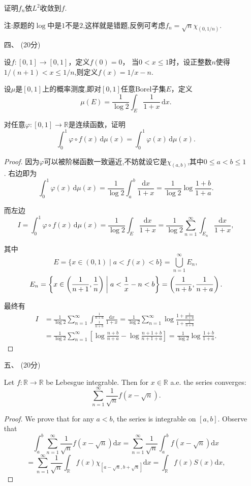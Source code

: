 \begin{itemize}
证明$ f_{n} $依$ L^{2} $收敛到$ f $.

注:原题的$ \log $中是$ 1 $不是$ 2 $,这样就是错题,反例可考虑$ f_{n}=\sqrt{n}\chi_{(0,1/n)} $.


\item[四、](20分)

设$ f\colon[0,1]\to [0,1] $，定义$ f(0)=0 $，
当$ 0<x\le 1 $时，设正整数$ n $使得$ 1/(n+1)<x\le 1/n $,则定义$ f(x)=1/x-n $.

设$ \mu $是$ [0,1] $上的概率测度,即对$ [0,1] $任意Borel子集$ E $，定义
$$\mu(E) =\frac{1}{\log 2}\int_E\frac{1}{1+x}\,\text{d}x.$$

对任意$ \varphi\colon[0,1]\to \mathbb{R}  $是连续函数，证明
$$\int_0^1{\varphi \circ f(x) \,\text{d}\mu(x)}
=\int_0^1{\varphi (x) \,\text{d}\mu(x)}.$$

\begin{proof}
因为$ \varphi $可以被阶梯函数一致逼近,不妨就设它是$ \chi_{(a,b)} $,其中$ 0\le a<b\le 1 $.
右边即为
$$\int_0^1{\varphi (x) \,\text{d}\mu(x)}
=\frac{1}{\log 2}\int_a^b{\frac{\text{d}x}{1+x}}
=\frac{1}{\log 2}\log \frac{1+b}{1+a}.$$

而左边
$$I=\int_0^1{\varphi \circ f(x) \,\text{d}\mu(x)}
=\frac{1}{\log 2}\int_E\frac{\text{d}x}{1+x}
=\frac{1}{\log 2}\sum_{n=1}^{\infty}\int_{E_n}\frac{\text{d}x}{1+x},$$

其中
$$E=\{x\in (0,1) \mid a<f(x)<b\} =\bigcup_{n=1}^{\infty}{E_n},$$
$$E_n=\left\{ x\in \left( \frac{1}{n+1},\frac{1}{n} \right) \biggm| a<\frac{1}{x}-n<b \right\} 
=\left( \frac{1}{n+b},\frac{1}{n+a} \right).$$

最终有
\begin{align*}
I&=\frac{1}{\log 2}\sum_{n=1}^{\infty}\int_{\frac{1}{n+b}}^{\frac{1}{n+a}}\frac{\text{d}x}{1+x}
=\frac{1}{\log 2}\sum_{n=1}^{\infty}\log\frac{1+\frac{1}{n+a}}{1+\frac{1}{n+b}}\\
&=\frac{1}{\log 2}\sum_{n=1}^{\infty}\left[\log\frac{n+b}{n+a}-\log\frac{n+1+b}{n+1+a}\right]
=\frac{1}{\log 2}\log\frac{1+b}{1+a}.
\end{align*}
\end{proof}

\item[五、](20分)

Let $ f\colon\mathbb{R} \to \mathbb{R}  $ be Lebesgue integrable. 
Then for $ x\in \mathbb{R}  $ a.e. the series converges:
$$
\sum_{n=1}^{\infty}{\frac{1}{\sqrt{n}}f( x-\sqrt{n} )}.
$$

\begin{proof}
	We prove that for any $ a<b $, the series is integrable on $ [a,b] $. Observe that
	$$
	\int_a^b{\sum_{n=1}^{\infty}{\frac{1}{\sqrt{n}}f( x-\sqrt{n} )}\mathrm{d} x}=\sum_{n=1}^{\infty}{\frac{1}{\sqrt{n}}\int_a^b{f( x-\sqrt{n} ) \mathrm{d} x}}
	$$
	$$
	=\sum_{n=1}^{\infty}{\frac{1}{\sqrt{n}}\int_{\mathbb{R}}^{}{f( x ) \chi _{\left[ a-\sqrt{n},b+\sqrt{n} \right]}\mathrm{d} x}=\int_{\mathbb{R}}^{}{f( x ) S( x ) \mathrm{d} x}},
	$$
	

\end{proof}
\end{itemize}
